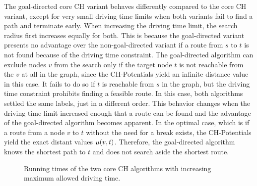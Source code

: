 The goal-directed core CH variant behaves differently compared to the core CH variant, except for very small driving time limits when both variants fail to find a path and terminate early. When increasing the driving time limit, the search radius first increases equally for both. This is because the goal-directed variant presents no advantage over the non-goal-directed variant if a route from $s$ to $t$ is not found because of the driving time constraint. The goal-directed algorithm can exclude nodes $v$ from the search only if the target node $t$ is not reachable from the $v$ at all in the graph, since the CH-Potentials yield an infinite distance value in this case. It fails to do so if $t$ is reachable from $s$ in the graph, but the driving time constraint prohibits finding a feasible route. In this case, both algorithms settled the same labels, just in a different order. This behavior changes when the driving time limit increased enough that a route can be found and the advantage of the goal-directed algorithm becomes apparent. In the optimal case, which is if a route from a node $v$ to $t$ without the need for a break exists, the CH-Potentials yield the exact distant values $\mu(v,t)$. Therefore, the goal-directed algorithm knows the shortest path to $t$ and does not search aside the shortest route.

\begin{figure}[hbtp]
	\centering
	\hfill
	\caption{Running times of the two core CH algorithms with increasing maximum allowed driving time.}
	\label{fig:eval_driving_time}
\end{figure}

